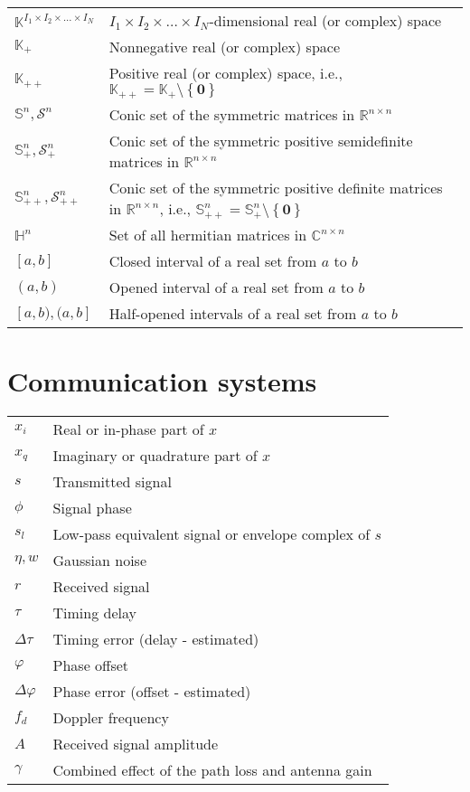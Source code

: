 \documentclass{article}
\begin{document}
\begin{xltabular}{\textwidth}{XX}
    \(\mathbb{K}^{I_1\times I_2 \times \dots \times I_N}\) & \(I_1\times I_2 \times \dots \times I_N\)-dimensional real (or complex) space\\
    \(\mathbb{K}_{+}\) & Nonnegative real (or complex) space\\
    \(\mathbb{K}_{++}\) & Positive real (or complex) space, i.e., \(\mathbb{K}_{++} = \mathbb{K}_{+}\setminus\left\{ \mathbf{0} \right\}\)\\
    \(\mathbb{S}^{n}, \mathcal{S}^{n}\) & Conic set of the symmetric matrices in \(\mathbb{R}^{n\times n}\)\\
    \(\mathbb{S}_{+}^{n}, \mathcal{S}_{+}^{n}\) & Conic set of the symmetric positive semidefinite matrices in \(\mathbb{R}^{n\times n}\)\\
    \(\mathbb{S}_{++}^{n}, \mathcal{S}_{++}^{n}\) & Conic set of the symmetric positive definite matrices in \(\mathbb{R}^{n\times n}\), i.e., \(\mathbb{S}_{++}^{n} = \mathbb{S}_{+}^{n}\setminus \left\{ \mathbf{0} \right\}\)\\
    \(\mathbb{H}^{n}\) & Set of all hermitian matrices in \(\mathbb{C}^{n\times n}\)\\
    \([a, b]\) & Closed interval of a real set from \(a\) to \(b\)\\
    \((a, b)\) & Opened interval of a real set from \(a\) to \(b\)\\
    \([a, b), (a, b]\) & Half-opened intervals of a real set from \(a\) to \(b\)\\
\end{xltabular}

\section{Communication systems}
\begin{xltabular}{\textwidth}{XX}
    \(x_i\) & Real or in-phase part of \(x\)\\
    \(x_q\) & Imaginary or quadrature part of \(x\)\\
    \(s\) & Transmitted signal\\
    \(\phi\) & Signal phase\\
    \(s_l\) & Low-pass equivalent signal or envelope complex of \(s\)\\
    \(\eta, w\) & Gaussian noise\\
    \(r\) & Received signal\\
    \(\tau\) & Timing delay \\
    \(\Delta\tau\) & Timing error (delay - estimated) \\
    \(\varphi\) & Phase offset \\
    \(\Delta\varphi\) & Phase error (offset - estimated) \\
    \(f_d\) & Doppler frequency\\
    \(A\) & Received signal amplitude\\
    \(\gamma\) & Combined effect of the path loss and antenna gain
\end{xltabular}
\end{document}
